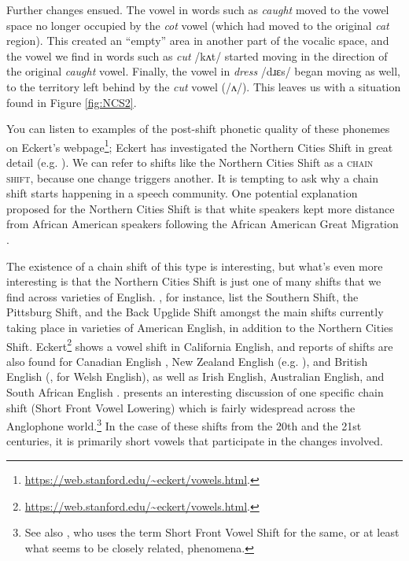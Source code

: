 \noindent Further changes ensued. The vowel in words such as \emph{caught} moved to the vowel space no longer occupied by the \emph{cot} vowel (which had moved to the original \emph{cat} region). This created an ``empty'' area in another part of the vocalic space, and the vowel we find in words such as \emph{cut} /kʌt/ started moving in the direction of the original \emph{caught} vowel. Finally, the vowel in \emph{dress} /dɹɛs/ began moving as well, to the territory left behind by the \emph{cut} vowel (/ʌ/). This leaves us with a situation found in Figure \ref{fig:NCS2}.

You can listen to examples of the post-shift phonetic quality of these phonemes on Eckert's webpage\footnote{\url{https://web.stanford.edu/~eckert/vowels.html}.}; Eckert has investigated the Northern Cities Shift in great detail (e.g. \citealp{Eckert1990}). We can refer to shifts like the Northern Cities Shift as a \textsc{chain shift}, because one change triggers another. It is tempting to ask why a chain shift starts happening in a speech community. One potential explanation proposed for the Northern Cities Shift is that white speakers kept more distance from African American speakers following the African American Great Migration \citep{VanHerk2008}.

The existence of a chain shift of this type is interesting, but what's even more interesting is that the Northern Cities Shift is just one of many shifts that we find across varieties of English. \citet{LabovAshBoberg2006}, for instance, list the Southern Shift, the Pittsburg Shift, and the Back Upglide Shift amongst the main shifts currently taking place in varieties of American English, in addition to the Northern Cities Shift. Eckert\footnote{\url{https://web.stanford.edu/~eckert/vowels.html}.} shows a vowel shift in California English, and reports of shifts are also found for Canadian English \citep[212]{ClarkeElmsYoussef1995}, New Zealand English (e.g. \citealp{Langstrof2006}), and British English (\citealp{Hickey2018}, \citealp[272--273]{Hejna2015} for Welsh English), as well as Irish English, Australian English, and South African English \citep{Hickey2018}. \citet{Hickey2018} presents an interesting discussion of one specific chain shift (Short Front Vowel Lowering) which is fairly widespread across the Anglophone world.\footnote{See also \citet{Boberg2019}, who uses the term Short Front Vowel Shift for the same, or at least what seems to be closely related, phenomena.} In the case of these shifts from the 20th and the 21st centuries, it is primarily short vowels that participate in the changes involved.

